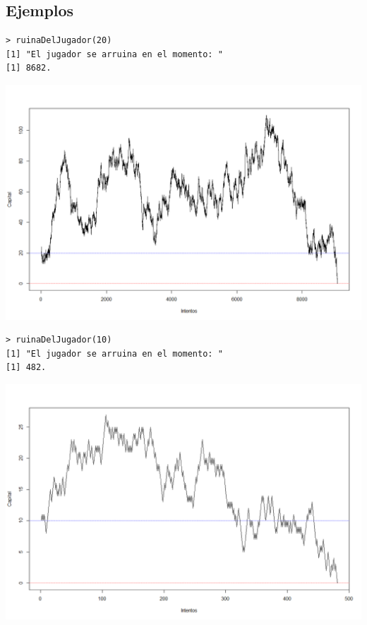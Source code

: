 \documentclass[10pt,a4paper]{article}
\begin{document}
\subsection{Ejemplos}
\begin{verbatim}
> ruinaDelJugador(20)
[1] "El jugador se arruina en el momento: "
[1] 8682.
\end{verbatim}
\begin{center}
\includegraphics[scale=0.35]{Jugador20_1.png} 
\end{center}

\begin{verbatim}
> ruinaDelJugador(10)
[1] "El jugador se arruina en el momento: "
[1] 482.
\end{verbatim}
\begin{center}
\includegraphics[scale=0.35]{Jugador10_1.png} 
\end{center}

\newpage


\end{document}
